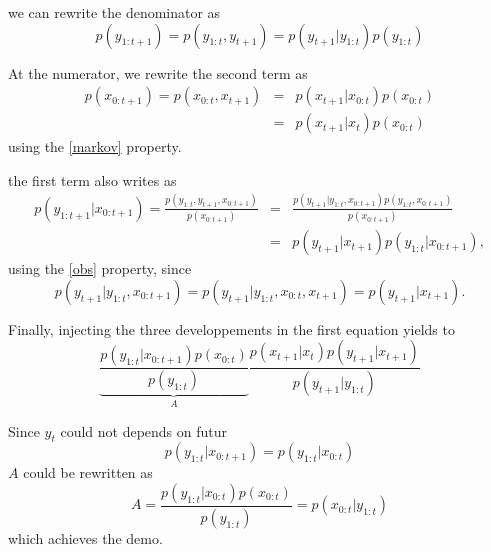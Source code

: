\documentclass{article}
\begin{document}
we can rewrite the denominator as
$$
p(y_{1:t+1}) = p(y_{1:t}, y_{t+1}) = p(y_{t+1} | y_{1:t} ) p(y_{1:t})
$$

At the numerator, we rewrite the second term as
\begin{eqnarray*}
p(x_{0:t+1}) = p(x_{0:t}, x_{t+1}) & = & p(x_{t+1} | x_{0:t} ) p(x_{0:t}) \\
                                   & = & p(x_{t+1} | x_t) p(x_{0:t}) 
\end{eqnarray*}
using the \eqref{markov} property.

the first term also writes as
\begin{eqnarray*}
p(y_{1:t+1} | x_{0:t+1}) = \frac{p(y_{1:t}, y_{t+1}, x_{0:t+1})}{p(x_{0:t+1})} & =& \frac{p(y_{t+1} | y_{1:t}, x_{0:t+1})p(y_{1:t},x_{0:t+1})}{p(x_{0:t+1})} \\
& = & p(y_{t+1} | x_{t+1}) p(y_{1:t} | x_{0:t+1}),
\end{eqnarray*} 
using the \eqref{obs} property, since
$$
p(y_{t+1} | y_{1:t}, x_{0:t+1}) = p(y_{t+1} | y_{1:t}, x_{0:t}, x_{t+1} ) = p(y_{t+1} | x_{t+1}).
$$

Finally, injecting the three developpements in the first equation yields to
$$
\underbrace{\frac{p(y_{1:t} | x_{0:t+1}) p(x_{0:t})}{p(y_{1:t})}}_{A}\frac{p(x_{t+1}|x_t) p(y_{t+1} | x_{t+1}) }{p(y_{t+1}| y_{1:t})}
$$
 
Since $y_{t}$ could not depends on futur  
$$
p(y_{1:t} | x_{0:t+1}) = p(y_{1:t} | x_{0:t})
$$
$A$ could be rewritten as
$$
A = \frac{p(y_{1:t} | x_{0:t}) p(x_{0:t})}{p(y_{1:t})} = p(x_{0:t} | y_{1:t})
$$
which achieves the demo.
\end{document}
